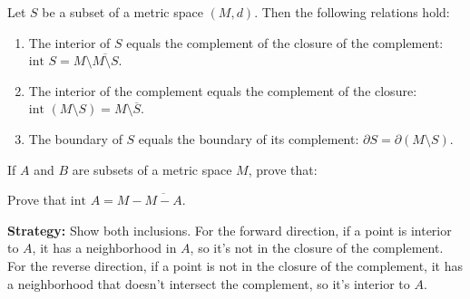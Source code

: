 \begin{theorem}
Let $S$ be a subset of a metric space $(M,d)$. Then the following relations hold:
\begin{enumerate}
\item The interior of $S$ equals the complement of the closure of the complement: $\text{int } S = M \setminus \overline{M \setminus S}$.
\item The interior of the complement equals the complement of the closure: $\text{int }(M \setminus S) = M \setminus \overline{S}$.
\item The boundary of $S$ equals the boundary of its complement: $\partial S = \partial(M \setminus S)$.
\end{enumerate}
\end{theorem}

If $A$ and $B$ are subsets of a metric space $M$, prove that:



\begin{problembox}
\begin{problemstatement}
Prove that \(\text{int } A = M - \overline{M - A}\).
\end{problemstatement}
\end{problembox}

\noindent\textbf{Strategy:} Show both inclusions. For the forward direction, if a point is interior to $A$, it has a neighborhood in $A$, so it's not in the closure of the complement. For the reverse direction, if a point is not in the closure of the complement, it has a neighborhood that doesn't intersect the complement, so it's interior to $A$.


